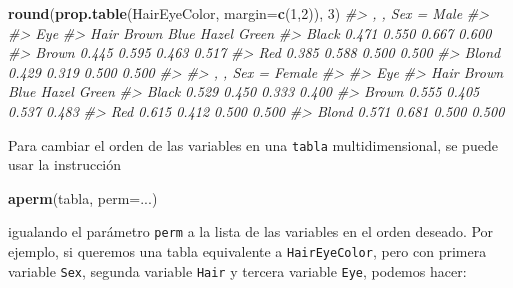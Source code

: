 \documentclass[
]{book}
\newenvironment{Shaded}{\begin{snugshade}}{\end{snugshade}}
\newcommand{\CommentTok}[1]{\textcolor[rgb]{0.56,0.35,0.01}{\textit{#1}}}
\newcommand{\DataTypeTok}[1]{\textcolor[rgb]{0.13,0.29,0.53}{#1}}
\newcommand{\DecValTok}[1]{\textcolor[rgb]{0.00,0.00,0.81}{#1}}
\newcommand{\KeywordTok}[1]{\textcolor[rgb]{0.13,0.29,0.53}{\textbf{#1}}}
\newcommand{\NormalTok}[1]{#1}
\theoremstyle{definition}
\theoremstyle{definition}
\theoremstyle{definition}
\theoremstyle{remark}
\begin{document}
\begin{Shaded}
\begin{Highlighting}[]
\KeywordTok{round}\NormalTok{(}\KeywordTok{prop.table}\NormalTok{(HairEyeColor, }\DataTypeTok{margin=}\KeywordTok{c}\NormalTok{(}\DecValTok{1}\NormalTok{,}\DecValTok{2}\NormalTok{)), }\DecValTok{3}\NormalTok{)}
\CommentTok{\#\textgreater{} , , Sex = Male}
\CommentTok{\#\textgreater{} }
\CommentTok{\#\textgreater{}        Eye}
\CommentTok{\#\textgreater{} Hair    Brown  Blue Hazel Green}
\CommentTok{\#\textgreater{}   Black 0.471 0.550 0.667 0.600}
\CommentTok{\#\textgreater{}   Brown 0.445 0.595 0.463 0.517}
\CommentTok{\#\textgreater{}   Red   0.385 0.588 0.500 0.500}
\CommentTok{\#\textgreater{}   Blond 0.429 0.319 0.500 0.500}
\CommentTok{\#\textgreater{} }
\CommentTok{\#\textgreater{} , , Sex = Female}
\CommentTok{\#\textgreater{} }
\CommentTok{\#\textgreater{}        Eye}
\CommentTok{\#\textgreater{} Hair    Brown  Blue Hazel Green}
\CommentTok{\#\textgreater{}   Black 0.529 0.450 0.333 0.400}
\CommentTok{\#\textgreater{}   Brown 0.555 0.405 0.537 0.483}
\CommentTok{\#\textgreater{}   Red   0.615 0.412 0.500 0.500}
\CommentTok{\#\textgreater{}   Blond 0.571 0.681 0.500 0.500}
\end{Highlighting}
\end{Shaded}

Para cambiar el orden de las variables en una \texttt{tabla} multidimensional, se puede usar la instrucción

\begin{Shaded}
\begin{Highlighting}[]
\KeywordTok{aperm}\NormalTok{(tabla, }\DataTypeTok{perm=}\NormalTok{...)}
\end{Highlighting}
\end{Shaded}

igualando el parámetro \texttt{perm} a la lista de las variables en el orden deseado. Por ejemplo, si queremos una tabla equivalente a \texttt{HairEyeColor}, pero con primera variable \texttt{Sex}, segunda variable \texttt{Hair} y tercera variable \texttt{Eye}, podemos hacer:
\end{document}
